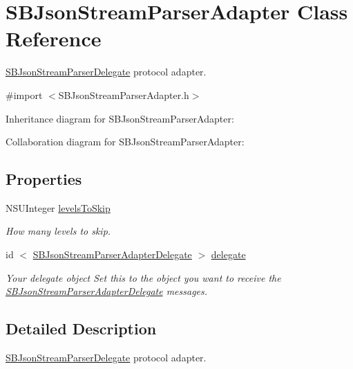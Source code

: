 \hypertarget{interface_s_b_json_stream_parser_adapter}{
\section{\-S\-B\-Json\-Stream\-Parser\-Adapter \-Class \-Reference}
\label{interface_s_b_json_stream_parser_adapter}
}


\hyperlink{protocol_s_b_json_stream_parser_delegate-p}{\-S\-B\-Json\-Stream\-Parser\-Delegate} protocol adapter.  




{\ttfamily \#import $<$\-S\-B\-Json\-Stream\-Parser\-Adapter.\-h$>$}



\-Inheritance diagram for \-S\-B\-Json\-Stream\-Parser\-Adapter\-:


\-Collaboration diagram for \-S\-B\-Json\-Stream\-Parser\-Adapter\-:
\subsection*{\-Properties}
\begin{DoxyCompactItemize}
\item 
\-N\-S\-U\-Integer \hyperlink{interface_s_b_json_stream_parser_adapter_a1b7451c67d9149b14632c228909659bb}{levels\-To\-Skip}
\begin{DoxyCompactList}\small\item\em \-How many levels to skip. \end{DoxyCompactList}\item 
\hypertarget{interface_s_b_json_stream_parser_adapter_ae64dd83cfbaa69e35a5c8b0ec1da070b}{
id\*
$<$ \hyperlink{protocol_s_b_json_stream_parser_adapter_delegate-p}{\-S\-B\-Json\-Stream\-Parser\-Adapter\-Delegate} $>$ \hyperlink{interface_s_b_json_stream_parser_adapter_ae64dd83cfbaa69e35a5c8b0ec1da070b}{delegate}}
\label{interface_s_b_json_stream_parser_adapter_ae64dd83cfbaa69e35a5c8b0ec1da070b}

\begin{DoxyCompactList}\small\item\em \-Your delegate object \-Set this to the object you want to receive the \hyperlink{protocol_s_b_json_stream_parser_adapter_delegate-p}{\-S\-B\-Json\-Stream\-Parser\-Adapter\-Delegate} messages. \end{DoxyCompactList}\end{DoxyCompactItemize}


\subsection{\-Detailed \-Description}
\hyperlink{protocol_s_b_json_stream_parser_delegate-p}{\-S\-B\-Json\-Stream\-Parser\-Delegate} protocol adapter. 

